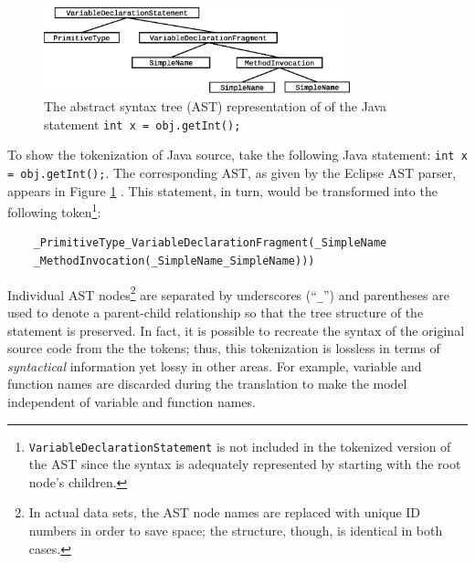 \documentclass[runningheads,a4paper]{llncs}
\begin{document}
\begin{figure}[ht]
\begin{center}
\centerline{\includegraphics[height=25mm]{ast.eps}}
\caption{The abstract syntax tree (AST) representation of of the Java statement
\texttt{int x = obj.getInt();}}
\label{ast-figure}
\end{center}
\vskip -7mm
\end{figure} 

To show the tokenization of Java source, take the following Java statement:
\texttt{int x = obj.getInt();}.
The corresponding AST, as given by the Eclipse AST parser, appears in Figure \ref{ast-figure} \cite{Eclipse}.
This statement, in turn, would be transformed into the following token\footnote{
\texttt{VariableDeclarationStatement} is not included in the
tokenized version of the AST since the syntax is adequately represented
by starting with the root node's children.}:


\begin{verbatim}
    _PrimitiveType_VariableDeclarationFragment(_SimpleName
    _MethodInvocation(_SimpleName_SimpleName))) 
\end{verbatim}
%

Individual AST nodes\footnote{In actual data sets, the AST node names are replaced with unique
ID numbers in order to save space; the structure, though, is identical in both cases.}
are separated by underscores (``\texttt{\_}'') and parentheses are used
to denote a parent-child relationship so that the tree structure of
the statement is preserved. In fact, it is possible  to recreate the
syntax of the original source  code from the the tokens; thus, this 
tokenization is lossless in terms of  \textit{syntactical} information 
yet lossy in other areas. For example, variable and function names are
discarded during the translation to make the model independent of
variable and function names.
\end{document}
